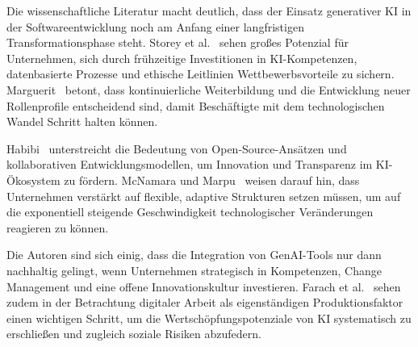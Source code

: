 Die wissenschaftliche Literatur macht deutlich, dass der Einsatz generativer KI
in der Softwareentwicklung noch am Anfang einer langfristigen
Transformationsphase steht. Storey et al.~\cite{storey_generative_2025} sehen
großes Potenzial für Unternehmen, sich durch frühzeitige Investitionen in
KI-Kompetenzen, datenbasierte Prozesse und ethische Leitlinien
Wettbewerbsvorteile zu sichern. Marguerit~\cite{marguerit_augmenting_2025}
betont, dass kontinuierliche Weiterbildung und die Entwicklung neuer
Rollenprofile entscheidend sind, damit Beschäftigte mit dem technologischen
Wandel Schritt halten können.

Habibi~\cite{habibi_open_2025} unterstreicht die Bedeutung von
Open-Source-Ansätzen und kollaborativen Entwicklungsmodellen, um Innovation und
Transparenz im KI-Ökosystem zu fördern. McNamara und
Marpu~\cite{mcnamara_exponential_2025} weisen darauf hin, dass Unternehmen
verstärkt auf flexible, adaptive Strukturen setzen müssen, um auf die
exponentiell steigende Geschwindigkeit technologischer Veränderungen reagieren
zu können.

Die Autoren sind sich einig, dass die Integration von GenAI-Tools nur dann
nachhaltig gelingt, wenn Unternehmen strategisch in Kompetenzen, Change
Management und eine offene Innovationskultur investieren. Farach et
al.~\cite{farach_evolving_2025} sehen zudem in der Betrachtung digitaler Arbeit
als eigenständigen Produktionsfaktor einen wichtigen Schritt, um die
Wertschöpfungspotenziale von KI systematisch zu erschließen und zugleich
soziale Risiken abzufedern.

